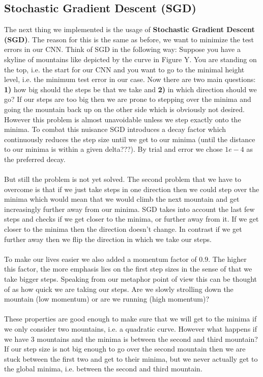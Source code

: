 \documentclass{article}
\begin{document}
	\subsection{Stochastic Gradient Descent (SGD)}
	\label{subsec:StochasticGradientDescent}
	The next thing we implemented is the usage of \textbf{Stochastic Gradient Descent (SGD)}. The reason for this is the same as before, we want to minimize the test errors in our CNN. 
	Think of SGD in the following way: Suppose you have a skyline of mountains like depicted by the curve in Figure Y. You are standing on the top, i.e. the start for our CNN and you want to go to the minimal height level, i.e. the minimum test error in our case. Now there are two main questions: \textbf{1)} how big should the steps be that we take and \textbf{2)} in which direction should we go? If our steps are too big then we are prone to stepping over the minima and going the mountain back up on the other side which is obviously not desired. However this problem is almost unavoidable unless we step exactly onto the minima. To combat this nuisance SGD introduces a decay factor which continuously reduces the step size until we get to our minima (until the distance to our minima is within a given delta???). By trial and error we chose $1e-4$ as the preferred decay. \\
	\\
	But still the problem is not yet solved. The second problem that we have to overcome is that if we just take steps in one direction then we could step over the minima which would mean that we would climb the next mountain and get increasingly further away from our minima. SGD takes into account the last few steps and checks if we get closer to the minima, or further away from it. If we get closer to the minima then the direction doesn't change. In contrast if we get further away then we flip the direction in which we take our steps. \\
	\\
	To make our lives easier we also added a momentum factor of $0.9$. The higher this factor, the more emphasis lies on the first step sizes in the sense of that we take bigger steps. Speaking from our metaphor point of view this can be thought of as how quick we are taking our steps. Are we slowly strolling down the mountain (low momentum) or are we running (high momentum)? \\
	\\
	These properties are good enough to make sure that we will get to the minima if we only consider two mountains, i.e. a quadratic curve. However what happens if we have 3 mountains and the minima is between the second and third mountain? If our step size is not big enough to go over the second mountain then we are stuck between the first two and get to their minima, but we never actually get to the global minima, i.e. between the second and third mountain. \\
\end{document}
